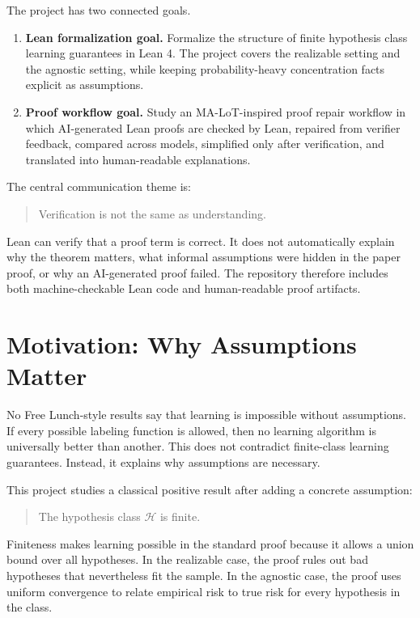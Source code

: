 \documentclass[11pt]{article}
\newcommand{\Hclass}{\mathcal{H}}
\theoremstyle{definition}
\begin{document}
The project has two connected goals.

\begin{enumerate}[leftmargin=*]
  \item \textbf{Lean formalization goal.} Formalize the structure of finite
  hypothesis class learning guarantees in Lean 4. The project covers the
  realizable setting and the agnostic setting, while keeping probability-heavy
  concentration facts explicit as assumptions.
  \item \textbf{Proof workflow goal.} Study an MA-LoT-inspired proof repair
  workflow in which AI-generated Lean proofs are checked by Lean, repaired from
  verifier feedback, compared across models, simplified only after verification,
  and translated into human-readable explanations.
\end{enumerate}

The central communication theme is:

\begin{quote}
Verification is not the same as understanding.
\end{quote}

Lean can verify that a proof term is correct. It does not automatically explain
why the theorem matters, what informal assumptions were hidden in the paper
proof, or why an AI-generated proof failed. The repository therefore includes
both machine-checkable Lean code and human-readable proof artifacts.

\section{Motivation: Why Assumptions Matter}

No Free Lunch-style results say that learning is impossible without assumptions.
If every possible labeling function is allowed, then no learning algorithm is
universally better than another. This does not contradict finite-class learning
guarantees. Instead, it explains why assumptions are necessary.

This project studies a classical positive result after adding a concrete
assumption:

\begin{quote}
The hypothesis class $\Hclass$ is finite.
\end{quote}

Finiteness makes learning possible in the standard proof because it allows a
union bound over all hypotheses. In the realizable case, the proof rules out bad
hypotheses that nevertheless fit the sample. In the agnostic case, the proof
uses uniform convergence to relate empirical risk to true risk for every
hypothesis in the class.
\end{document}
